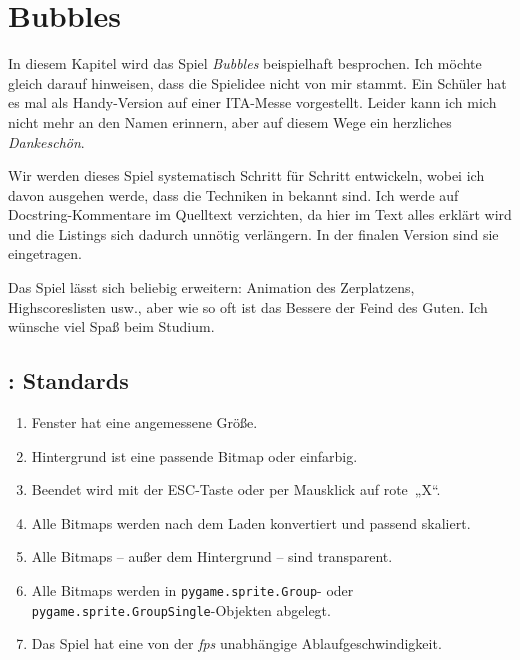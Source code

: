 \newpage
\section{Bubbles}

In diesem Kapitel wird das Spiel \emph{Bubbles} beispielhaft besprochen. Ich möchte gleich darauf hinweisen, dass die Spielidee nicht von mir stammt. Ein Schüler hat es mal als Handy-Version auf einer ITA-Messe vorgestellt. Leider kann ich mich nicht mehr an den Namen erinnern, aber auf diesem Wege ein herzliches \emph{Dankeschön}. 

Wir werden dieses Spiel systematisch Schritt für Schritt entwickeln, wobei ich davon ausgehen werde, dass die Techniken in  bekannt sind. Ich werde auf Docstring-Kommentare im Quelltext verzichten, da hier im Text alles erklärt wird und die Listings sich dadurch unnötig verlängern. In der finalen Version sind sie eingetragen.

Das Spiel lässt sich beliebig erweitern: Animation des Zerplatzens, Highscoreslisten usw., aber wie so oft ist das Bessere der Feind des Guten. Ich wünsche viel Spaß beim Studium.


\subsection{: Standards}

\begin{enumerate}
    \item Fenster hat eine angemessene Größe.\label{reqStandardGröße}
    \item Hintergrund ist eine passende Bitmap oder einfarbig.\label{reqStandardHintergrund}
    \item Beendet wird mit der ESC-Taste oder per Mausklick auf rote~„X“.\label{reqStandardBeenden}
    \item Alle Bitmaps werden nach dem Laden konvertiert und passend skaliert.\label{reqStandardSprite}
    \item Alle Bitmaps -- außer dem Hintergrund -- sind transparent.\label{reqStandardTransparenz}
    \item Alle Bitmaps werden in \texttt{pygame.sprite.Group}- oder \texttt{pygame.sprite.GroupSingle}-Objekten abgelegt.\label{reqStandardGruppe}
    \item Das Spiel hat eine von der \emph{fps} unabhängige Ablaufgeschwindigkeit.\label{reqStandardFps}
\end{enumerate}
\er


